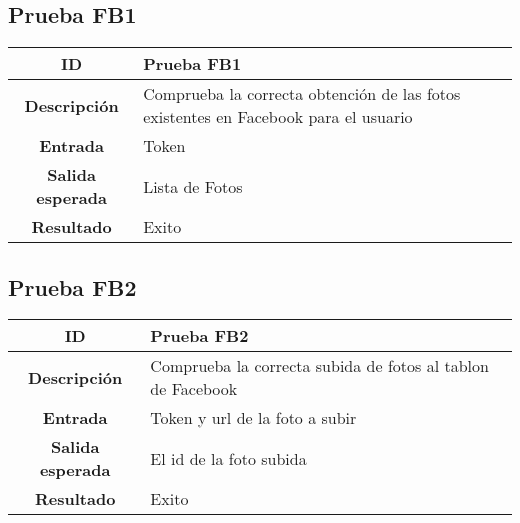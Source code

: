 \documentclass{scrartcl}
\begin{document}
\subsection{Prueba FB1}

\begin{tabularx}{14cm}{|c|X|}
	\hline \textbf{ID} & Prueba FB1\\ 
	\hline \textbf{Descripción} & Comprueba la correcta obtención de las fotos existentes en Facebook para el usuario \\	 
	\hline  \textbf{Entrada}		& Token \\ 
	\hline  \textbf{Salida esperada}			& Lista de Fotos\\
	\hline  \textbf{Resultado}			& Exito \\
	\hline 
\end{tabularx} 

\subsection{Prueba FB2}

\begin{tabularx}{14cm}{|c|X|}
	\hline \textbf{ID} & Prueba FB2\\ 
	\hline \textbf{Descripción} & Comprueba la correcta subida de fotos al tablon de Facebook \\	 
	\hline  \textbf{Entrada}		& Token y url de la foto a subir \\ 
	\hline  \textbf{Salida esperada}			& El id de la foto subida\\
	\hline  \textbf{Resultado}			& Exito \\
	\hline 
\end{tabularx} 
\end{document}
